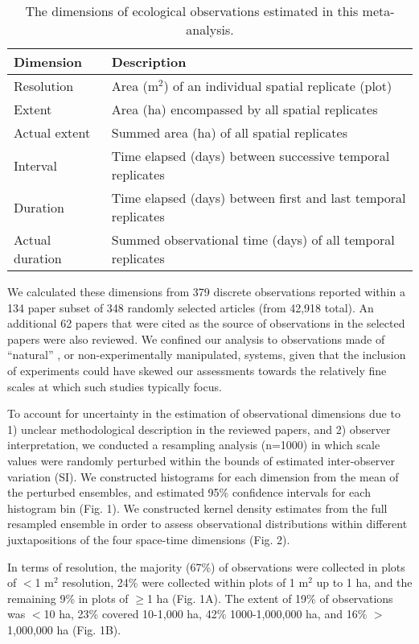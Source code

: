 \documentclass[12pt]{article}
\begin{document}
\begin{table}[htp]
\caption{The dimensions of ecological observations estimated in this meta-analysis.}
\begin{center}
\begin{tabular}{ll}
\hline
\textbf{Dimension} & \textbf{Description} \\
\hline
Resolution & Area (m$^2$) of an individual spatial replicate (plot) \\
Extent & Area (ha) encompassed by all spatial replicates \\
Actual extent & Summed area (ha) of all spatial replicates\\
Interval & Time elapsed (days) between successive temporal replicates \\
Duration & Time elapsed (days) between first and last temporal replicates\\
Actual duration & Summed observational time (days) of all temporal replicates\\
\hline
\end{tabular}
\end{center}
\label{default}
\end{table}%

We calculated these dimensions from 379 discrete observations reported within a 134 paper subset of 348 randomly selected articles (from 42,918 total). An additional 62 papers that were cited as the source of observations in the selected papers were also reviewed. We confined our analysis to observations made of ``natural'' \cite{tilman_ecological_1989}, or non-experimentally manipulated, systems, given that the inclusion of experiments could have skewed our assessments towards the relatively fine scales at which such studies typically focus. 

To account for uncertainty in the estimation of observational dimensions due to 1) unclear methodological description in the reviewed papers, and 2) observer interpretation, we conducted a resampling analysis (n=1000) in which scale values were randomly perturbed within the bounds of estimated inter-observer variation (SI). We constructed histograms for each dimension from the mean of the perturbed ensembles, and estimated 95\% confidence intervals for each histogram bin (Fig. 1). We constructed kernel density estimates from the full resampled ensemble in order to assess observational distributions within different juxtapositions of the four space-time dimensions (Fig. 2). 

In terms of resolution, the majority (67\%) of observations were collected in plots of $<$1 m$^2$ resolution, 24\% were collected within plots of 1 m$^2$ up to 1 ha, and the remaining 9\% in plots of $\geq$1 ha (Fig. 1A). The extent of 19\% of observations was $<$10 ha, 23\% covered 10-1,000 ha, 42\% 1000-1,000,000 ha, and 16\% $>$1,000,000 ha (Fig. 1B). 
\end{document}
